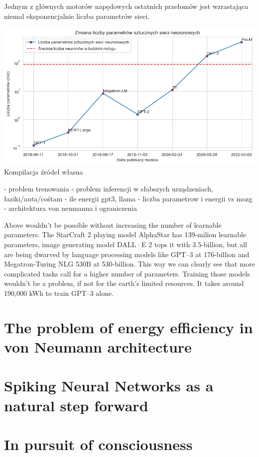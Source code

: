\documentclass{pracalicmgr2021}
\begin{document}
    Jednym z głównych motorów napędowych ostatnich przełomów jest wzrastająca niemal eksponencjalnie liczba parametrów sieci. 

    \includegraphics[width=\textwidth]{n_params.png}
    Kompilacja źródeł własna    
    
    - problem trenowania
    - problem inferencji w słabszych urządzeniach, łaziki/auta/cośtam
    - ile energii gpt3, llama
    - liczba parametrow i energii vs mozg 
    - architektura von neumanna i ograniczenia
    
    Above wouldn't be possible without increasing the number of learnable parameters. The StarCraft 2 playing model AlphaStar has 139-milion learnable parameters, image generating model DALL·E 2 tops it with 3.5-billion, but all are being dwarved by language processing models like GPT--3 at 176-billion and Megatron-Turing NLG 530B at 530-billion\cite{alphastar, dalle, gpt, megatron}. This way we can clearly see that more complicated tasks call for a higher number of parameters. Training those models wouldn't be a problem, if not for the earth's limited resources. It takes around 190,000 kWh to train GPT--3 alone\cite{energy}. 
    
    \section{The problem of energy efficiency in von Neumann architecture}
    
    \section{Spiking Neural Networks as a natural step forward}
    
    \section{In pursuit of consciousness}
    
\end{document}
